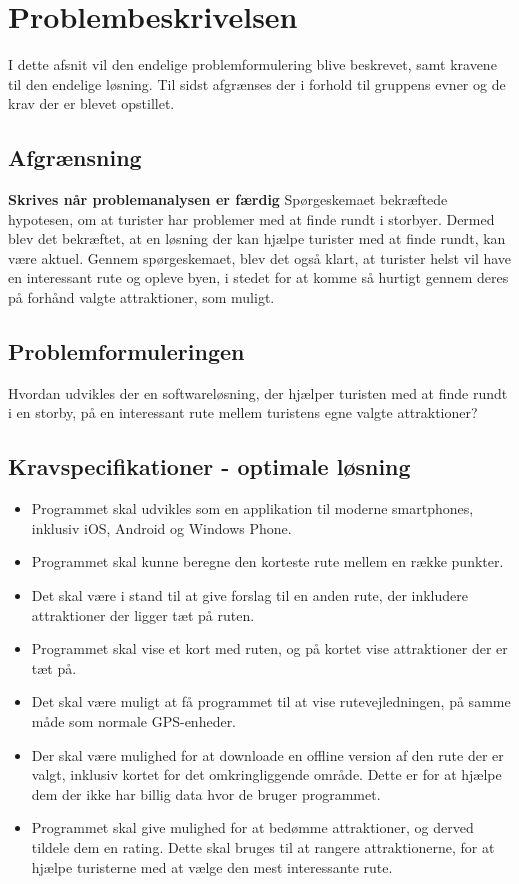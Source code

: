 \chapter{Problembeskrivelsen}

I dette afsnit vil den endelige problemformulering blive beskrevet, samt kravene til den endelige løsning. Til sidst afgrænses der i forhold til gruppens evner og de krav der er blevet opstillet. 


\section{Afgrænsning}
\textbf{Skrives når problemanalysen er færdig} \newline
Spørgeskemaet bekræftede hypotesen, om at turister har problemer med at finde rundt i storbyer. Dermed blev det bekræftet, at en løsning der kan hjælpe turister med at finde rundt, kan være aktuel. Gennem spørgeskemaet, blev det også klart, at turister helst vil have en interessant rute og opleve byen, i stedet for at komme så hurtigt gennem deres på forhånd valgte attraktioner, som muligt. 


\section{Problemformuleringen}
Hvordan udvikles der en softwareløsning, der hjælper turisten med at finde rundt i en storby, på en interessant rute mellem turistens egne valgte attraktioner?

\section{Kravspecifikationer - optimale løsning}

\begin{itemize}
	\item Programmet skal udvikles som en applikation til moderne smartphones, inklusiv iOS, Android og Windows Phone. 
	\item Programmet skal kunne beregne den korteste rute mellem en række punkter.
	\item Det skal være i stand til at give forslag til en anden rute, der inkludere attraktioner der ligger tæt på ruten.
	\item Programmet skal vise et kort med ruten, og på kortet vise attraktioner der er tæt på. 
	\item Det skal være muligt at få programmet til at vise rutevejledningen, på samme måde som normale GPS-enheder. 
	\item Der skal være mulighed for at downloade en offline version af den rute der er valgt, inklusiv kortet for det omkringliggende område. Dette er for at hjælpe dem der ikke har billig data hvor de bruger programmet.
	\item Programmet skal give mulighed for at bedømme attraktioner, og derved tildele dem en rating. Dette skal bruges til at rangere attraktionerne, for at hjælpe turisterne med at vælge den mest interessante rute. 
\end{itemize}


